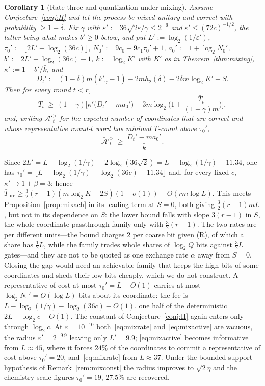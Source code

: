 \documentclass[aps,prx,twocolumn,superscriptaddress,nofootinbib,longbibliography]{revtex4-2}
\theoremstyle{plain}
\newtheorem{corollary}{Corollary}
\theoremstyle{definition}
\theoremstyle{remark}
\newcommand{\Tpre}{T_{\mathrm{pre}}}
\begin{document}
\begin{corollary}[Rate three and quantization under mixing]\label{cor:mixq}
Assume Conjecture~\ref{conj:H} and let the process be mixed-unitary and correct with probability $\ge1-\delta$. Fix $\gamma$ with $\varepsilon':=36\sqrt{2\varepsilon/\gamma}\le2^{-6}$ and $\varepsilon'\le(72c)^{-1/2}$, the latter being what makes $b'\ge0$ below, and put $L':=\log_2(1/\varepsilon')$, $\tau_0':=\lfloor2L'-\log_2(36c)\rfloor$, $N_0':=9c_0+9c_1\tau_0'+1$, $a_0':=1+\log_2N_0'$, $b':=2L'-\log_2(36c)-1$, $\bar k:=\log_2K'$ with $K'$ as in Theorem~\ref{thm:mixing}, $\kappa':=1+b'/\bar k$, and
\[
D_t':=(1-\delta)m(k'_\gamma-1)-2mh_2(\delta)-2\delta m\log_2K'-S.
\]
Then for every round $t<r$,
\begin{equation}\label{eq:mixrate}
\bar T_t\ \ge\ (1-\gamma)\Big[\kappa'\big(D_t'-ma_0'\big)-3m\log_2\Big(1+\frac{\bar T_t}{(1-\gamma)m}\Big)\Big],
\end{equation}
and, writing $\bar{\mathcal A}'^{>}_t$ for the expected number of coordinates that are correct and whose representative round-$t$ word has minimal $T$-count above $\tau_0'$,
\begin{equation}\label{eq:mixactive}
\bar{\mathcal A}'^{>}_t\ \ge\ \frac{D_t'-ma_0'}{\bar k}.
\end{equation}
\end{corollary}
Since $2L'=L-\log_2(1/\gamma)-2\log_2(36\sqrt2)=L-\log_2(1/\gamma)-11.34$, one has $\tau_0'=\lfloor L-\log_2(1/\gamma)-\log_2(36c)-11.34\rfloor$ and, for every fixed $c$, $\kappa'\to1+\beta=3$; hence $\bar\Tpre\ge\tfrac32(r-1)(m\log_2K-2S)(1-o(1))-O(rm\log L)$. This meets Proposition~\ref{prop:mixach} in its leading term at $S=0$, both giving $\tfrac32(r-1)mL$, but not in its dependence on $S$: the lower bound falls with slope $3(r-1)$ in $S$, the whole-coordinate passthrough family only with $\tfrac32(r-1)$. The two rates are per different units---the bound charges $2$ per coarse bit given (R), of which a share has $\tfrac12L$, while the family trades whole shares of $\log_2Q$ bits against $\tfrac32L$ gates---and they are not to be quoted as one exchange rate $\alpha$ away from $S=0$. Closing the gap would need an achievable family that keeps the high bits of some coordinates and sheds their low bits cheaply, which we do not construct. A representative of cost at most $\tau_0'=L-O(1)$ carries at most $\log_2N_0'=O(\log L)$ bits about its coordinate: the fee is $L-\log_2(1/\gamma)-\log_2(36c)-O(1)$, one half of the deterministic $2L-\log_2c-O(1)$. The constant of Conjecture~\ref{conj:H} again enters only through $\log_2c$. At $\varepsilon=10^{-10}$ both~\eqref{eq:mixrate} and~\eqref{eq:mixactive} are vacuous, the radius $\varepsilon'=2^{-9.9}$ leaving only $L'=9.9$; \eqref{eq:mixactive} becomes informative from $L\approx45$, where it forces $24\%$ of the coordinates to commit a representative of cost above $\tau_0'=20$, and~\eqref{eq:mixrate} from $L\approx37$. Under the bounded-support hypothesis of Remark~\ref{rem:mixconst} the radius improves to $\sqrt2\eta$ and the chemistry-scale figures $\tau_0'=19$, $27.5\%$ are recovered.
\end{document}
